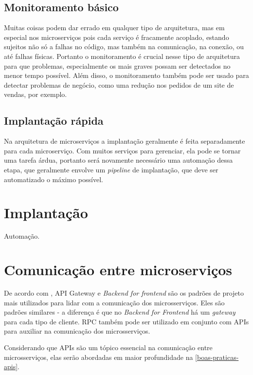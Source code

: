 \subsection{Monitoramento básico}

Muitas coisas podem dar errado em qualquer tipo de arquitetura, mas em especial nos microserviços pois cada serviço é fracamente acoplado, estando sujeitos não só a falhas no código, mas também na comunicação, na conexão, ou até falhas físicas. Portanto o monitoramento é crucial nesse tipo de arquitetura para que problemas, especialmente os mais graves possam ser detectados no menor tempo possível. Além disso, o monitoramento também pode ser usado para detectar problemas de negócio, como uma redução nos pedidos de um site de vendas, por exemplo. \cite{MartinFowlerMicroservices}

\subsection{Implantação rápida}

Na arquitetura de microserviços a implantação geralmente é feita separadamente para cada microserviço. Com muitos serviços para gerenciar, ela pode se tornar uma tarefa árdua, portanto será novamente necessário uma automação dessa etapa, que geralmente envolve um \emph{pipeline} de implantação, que deve ser automatizado o máximo possível. \cite{MartinFowlerMicroservices}

\section{Implantação}

Automação.

\section{Comunicação entre microserviços}

De acordo com , API Gateway e \emph{Backend for frontend} são os padrões de projeto mais utilizados para lidar com a comunicação dos microsserviços. Eles são padrões similares - a diferença é que no \emph{Backend for Frontend} há um \emph{gateway} para cada tipo de cliente. RPC também pode ser utilizado em conjunto com APIs para auxiliar na comunicação dos microsserviços. 

Considerando que APIs são um tópico essencial na comunicação entre microsserviços, elas serão abordadas em maior profundidade na \autoref{boas-praticas-apis}.

